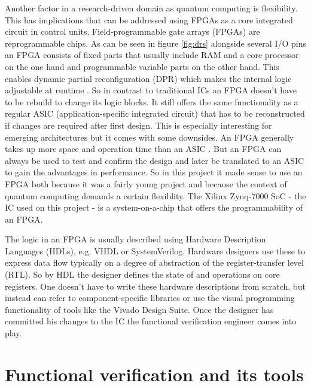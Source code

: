 Another factor in a research-driven domain as quantum computing is flexibility. This has implications that can be addressed using \acs{FPGA}s as a core integrated circuit in control units. Field-programmable gate arrays (\acs{FPGA}s) are reprogrammable chips. As can be seen in figure \ref{fig:drs} alongside several I/O pins an \acs{FPGA} consists of fixed parts that usually include RAM and a core processor on the one hand and programmable variable parts on the other hand. This enables dynamic partial reconfiguration (DPR) which makes the internal logic adjustable at runtime \cite[see][p. 97:1]{Gong14}. So in contrast to traditional \acs{IC}s an \acs{FPGA} doesn't have to be rebuild to change its logic blocks. It still offers the same functionality as a regular \acs{ASIC} (application-specific integrated circuit) that has to be reconstructed if changes are required after first design. This is especially interesting for emerging architectures but it comes with some downsides. An \acs{FPGA} generally takes up more space and operation time than an \acs{ASIC} \cite[see][p. 214]{Kuon07}. But an \acs{FPGA} can always be used to test and confirm the design and later be translated to an \acs{ASIC} to gain the advantages in performance. So in this project it made sense to use an \acs{FPGA} both because it was a fairly young project and because the context of quantum computing demands a certain flexiblity. The Xilinx Zynq-7000 \acs{SoC} - the \acs{IC} used on this project - is a system-on-a-chip that offers the programmability of an \acs{FPGA}.

The logic in an \acs{FPGA} is usually described using Hardware Description Languages (HDLs), e.g. VHDL or SystemVerilog. Hardware designers use these to express data flow typically on a degree of abstraction of the register-transfer level (RTL). So by HDL the designer defines the state of and operations on core registers. One doesn't have to write these hardware descriptions from scratch, but instead can refer to component-specific libraries or use the visual programming functionality of tools like the Vivado Design Suite.  Once the designer has committed his changes to the \acs{IC} the functional verification engineer comes into play.

\section{Functional verification and its tools}

